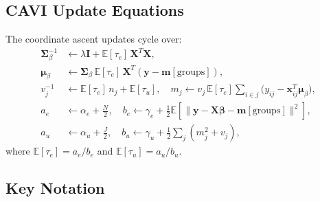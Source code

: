 \documentclass[11pt,a4paper]{article}
\newcommand{\E}{\mathbb{E}}
\begin{document}
\subsection{CAVI Update Equations}

The coordinate ascent updates cycle over:
\begin{align}
  \bm{\Sigma}_\beta^{-1} &\leftarrow \lambda\bm{I} + \E[\tau_e]\,\bm{X}^T\bm{X}, \label{eq:cavi_beta_cov}\\
  \bm{\mu}_\beta &\leftarrow \bm{\Sigma}_\beta\,\E[\tau_e]\,\bm{X}^T(\mathbf{y} - \bm{m}[\mathrm{groups}]),\\
  v_j^{-1} &\leftarrow \E[\tau_e]\,n_j + \E[\tau_u], \quad
  m_j \leftarrow v_j\,\E[\tau_e]\!\sum_{i\in j}\!\bigl(y_{ij} - \mathbf{x}_{ij}^T\bm{\mu}_\beta\bigr),\\
  a_e &\leftarrow \alpha_e + \tfrac{N}{2}, \quad
  b_e \leftarrow \gamma_e + \tfrac{1}{2}\E\!\left[\|\mathbf{y} - \bm{X}\bm{\beta} - \bm{m}[\mathrm{groups}]\|^2\right],\\
  a_u &\leftarrow \alpha_u + \tfrac{J}{2}, \quad
  b_u \leftarrow \gamma_u + \tfrac{1}{2}\sum_j\!(m_j^2 + v_j),
\end{align}
where $\E[\tau_e] = a_e/b_e$ and $\E[\tau_u] = a_u/b_u$.

\subsection{Key Notation}
\end{document}
